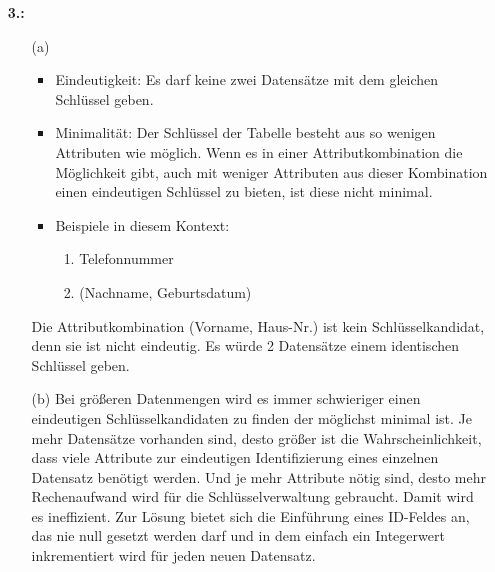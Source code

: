 \documentclass[a4paper,11pt,fleqn]{scrartcl}
\begin{document}
\begin{enumerate}
	\newpage
	\item[\textbf{3.:}]
	\begin{enumerate}
		\item[(a)]
			\begin{itemize}
				\item Eindeutigkeit: Es darf keine zwei Datensätze mit dem gleichen Schlüssel geben.
				\item Minimalität: Der Schlüssel der Tabelle besteht aus so wenigen Attributen wie möglich. Wenn es in einer 
				Attributkombination die Möglichkeit gibt, auch mit weniger Attributen aus dieser Kombination einen eindeutigen 
				Schlüssel zu bieten, ist diese nicht minimal.
				\item Beispiele in diesem Kontext:
				\begin{enumerate}
					\item Telefonnummer
					\item (Nachname, Geburtsdatum)
				\end{enumerate}
			\end{itemize}
			Die Attributkombination (Vorname, Haus-Nr.) ist kein Schlüsselkandidat, denn sie ist nicht eindeutig. Es würde 2 
			Datensätze einem identischen Schlüssel geben. \\ 

		\item[(b)]
			Bei größeren Datenmengen wird es immer schwieriger einen eindeutigen Schlüsselkandidaten zu finden der möglichst 
			minimal ist. Je mehr Datensätze vorhanden sind, desto größer ist die Wahrscheinlichkeit, dass viele Attribute zur 
			eindeutigen Identifizierung eines einzelnen Datensatz benötigt werden. Und je mehr Attribute nötig sind, desto mehr 
			Rechenaufwand wird für die Schlüsselverwaltung gebraucht. Damit wird es ineffizient. Zur Lösung bietet sich die 
			Einführung eines ID-Feldes an, das nie null gesetzt werden darf und in dem einfach ein Integerwert inkrementiert 
			wird für jeden neuen Datensatz. 	
		\end{enumerate}	
	\end{enumerate}
\end{document}
